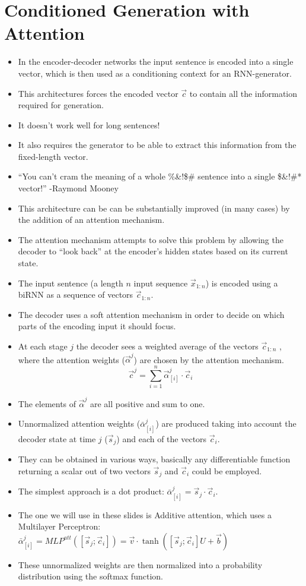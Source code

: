 \section{Conditioned Generation with Attention}
\begin{itemize}
\item In the encoder-decoder networks the input sentence is encoded into a single vector, which is then used as a conditioning context for an RNN-generator. 
\item This architectures forces the encoded vector $\vec{c}$ to contain all the information required for generation.
\item It doesn't work well for long sentences!
\item It also requires the generator to be able to extract this information from the fixed-length vector.
\item ``You can't cram the meaning of a whole \%\&!\$\# sentence into a single \$\&!\#* vector!'' -Raymond Mooney
\item This architecture can be can be substantially improved (in many cases) by the addition of an attention mechanism.
\item The attention mechanism attempts to solve this problem by allowing the decoder to “look back” at the encoder’s hidden states based on its current state. 
\item The input sentence (a length $n$ input sequence $\vec{x}_{1:n}$) is encoded using a biRNN as a sequence of vectors $\vec{c}_{1:n}$.  
\item The decoder uses a soft attention mechanism in order to decide on which parts of the encoding input it should focus. 
\item At each stage $j$ the decoder sees a weighted average of the vectors $\vec{c}_{1:n}$ , where the attention weights ($\vec{\alpha}^j$) are chosen by the attention mechanism.
\begin{displaymath}
\vec{c}^j = \sum_{i=1}^{n} \vec{\alpha}_{[i]}^{j}\cdot \vec{c}_i 
\end{displaymath}
\item The elements of $\vec{\alpha}^j$ are all positive and sum to one.
\item Unnormalized attention weights ($\bar{\alpha}_{[i]}^j$)  are produced taking into account the decoder state at time $j$ ($\vec{s}_j$) and each of the vectors $\vec{c}_i$.
\item They can be obtained in various ways, basically any differentiable function returning a scalar out of two vectors $\vec{s}_j$ and  $\vec{c}_i$ could be employed. 
\item The simplest approach is a dot product:  $\bar{\alpha}_{[i]}^j = \vec{s}_j \cdot \vec{c}_i$. 
\item The one we will use in these slides is Additive attention, which uses a Multilayer Perceptron: $\bar{\alpha}_{[i]}^j = MLP^{att}([\vec{s}_j;\vec{c}_i]) = \vec{v} \cdot \operatorname{tanh}([\vec{s}_j;\vec{c}_i]U +\vec{b})$
\item These unnormalized weights are then normalized into a probability distribution using the softmax function.


\end{itemize}
